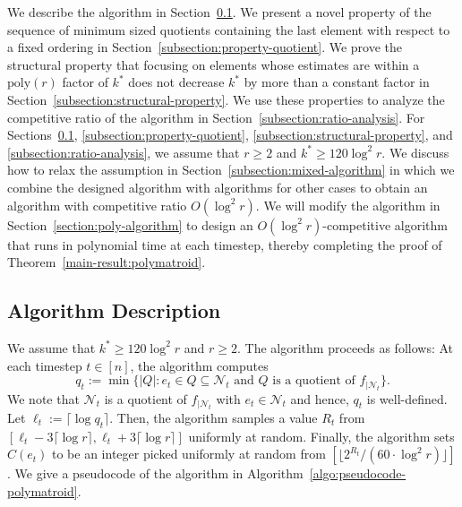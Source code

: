 \documentclass[11pt]{article}
\theoremstyle{definition}
\begin{document}
\fi
We describe the algorithm in Section~\ref{subsection:algorithm}. We present a novel property of the sequence of minimum sized quotients containing the last element with respect to a fixed ordering in Section~\ref{subsection:property-quotient}. We prove the structural property that 
focusing on elements whose estimates are within a $\text{poly}(r)$ factor of $k^*$ does not decrease $k^*$ by more than a constant factor 
in Section~\ref{subsection:structural-property}. We use these properties to analyze the competitive ratio of the algorithm in Section~\ref{subsection:ratio-analysis}. For Sections~\ref{subsection:algorithm}, \ref{subsection:property-quotient}, \ref{subsection:structural-property}, and \ref{subsection:ratio-analysis}, we assume that $r\geq 2$ and $k^*\geq 120\log^2 r$. We discuss how to relax the assumption in Section~\ref{subsection:mixed-algorithm} in which we combine the designed algorithm with algorithms for other cases to obtain an algorithm with competitive ratio $O(\log^2 r)$. 
We will modify the algorithm in Section~\ref{section:poly-algorithm} to design an $O(\log^2 r)$-competitive algorithm that runs in polynomial time at each timestep, thereby completing the proof of Theorem~\ref{main-result:polymatroid}.

\subsection{Algorithm Description}\label{subsection:algorithm}
We assume that $k^*\geq 120\log^2 r$ and $r\geq 2$. The algorithm proceeds as follows: At each timestep $t\in [n]$, 
the algorithm computes $$q_t:=\min \{|Q|: e_t\in Q \subseteq \mathcal{N}_t \text{ and $Q$ is a quotient of $f_{|\mathcal{N}_t}$}\}.$$ We note that $\mathcal{N}_t$ is a quotient of $f_{|\mathcal{N}_t}$ with $e_t\in \mathcal{N}_t$ and hence, $q_t$ is well-defined. Let $\ell_t:=\lceil \log q_t\rceil$. Then, the algorithm samples a value $R_t$ from $[\ell_t-3\lceil\log r\rceil, \ell_t+3\lceil\log r\rceil]$ uniformly at random. Finally, the algorithm sets $C(e_t)$ to be an integer picked uniformly at random from $[\lfloor2^{R_t}/(60\cdot \log ^2 r)\rfloor]$. We give a pseudocode of the algorithm in Algorithm~\ref{algo:pseudocode-polymatroid}.
\end{document}
